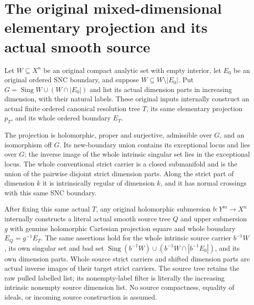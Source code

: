 \section{The original mixed-dimensional elementary projection and its actual smooth source}

\begin{theorem}
\label{hir:original-nonpure-canonical-elementary-smooth-projection}
\leanok
Let $W\subseteq X^n$ be an original compact analytic set with empty
interior, let $E_0$ be an original ordered SNC boundary, and suppose
$W\subseteq\overline{W\setminus|E_0|}$. Put
$G=\operatorname{Sing}W\cup(W\cap|E_0|)$ and list its actual
dimension parts in increasing dimension, with their natural labels.
These original inputs internally construct an actual finite ordered
canonical resolution tree $T$, its same elementary projection $p_T$,
and its whole ordered boundary $E_T$.

The projection is holomorphic, proper and surjective, admissible over
$G$, and an isomorphism off $G$. Its new-boundary union contains its
exceptional locus and lies over $G$; the inverse image of the whole
intrinsic singular set lies in the exceptional locus. The whole
conventional strict carrier is a closed submanifold and is the union
of the pairwise disjoint strict dimension parts. Along the strict
part of dimension $k$ it is intrinsically regular of dimension $k$,
and it has normal crossings with this same SNC boundary.

After fixing this same actual $T$, any original holomorphic
submersion $b:Y^m\to X^n$ internally constructs a literal actual
smooth source tree $Q$ and upper submersion $g$ with genuine
holomorphic Cartesian projection square and whole boundary
$E_Q=g^{-1}E_T$. The same assertions hold for the whole intrinsic
source carrier $b^{-1}W$, its own singular set and bad set
$\operatorname{Sing}(b^{-1}W)\cup(b^{-1}W\cap|b^{-1}E_0|)$, and
its own dimension parts. Whole source strict carriers and shifted
dimension parts are actual inverse images of their target strict
carriers. The source tree retains the raw pulled labelled list;
its nonempty-label filter is literally the increasing intrinsic
nonempty source dimension list. No source compactness, equality of
ideals, or incoming source construction is assumed.
\end{theorem}
